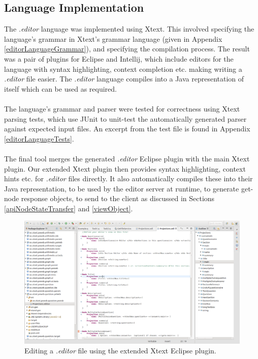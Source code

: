 \documentclass{article}
\begin{document}
{\subsection{Language Implementation}
The \emph{.editor} language was implemented using Xtext. This involved specifying the language's grammar in Xtext's grammar language (given in Appendix \ref{editorLanguageGrammar}), and specifying the compilation process. The result was a pair of plugins for Eclipse and Intellij, which include editors for the language with syntax highlighting, context completion etc. making writing a \emph{.editor} file easier. The \emph{.editor} language compiles into a Java representation of itself which can be used as required.
\\
\\
The language's grammar and parser were tested for correctness using Xtext parsing tests, which use JUnit to unit-test the automatically generated parser against expected input files. An excerpt from the test file is found in Appendix \ref{editorLanguageTests}.
\\
\\
The final tool merges the generated \emph{.editor} Eclipse plugin with the main Xtext plugin. Our extended Xtext plugin then provides syntax highlighting, context hints etc. for \emph{.editor} files directly. It also automatically compiles these into their Java representation, to be used by the editor server at runtime, to generate get-node response objects, to send to the client as discussed in Sections \ref{apiNodeStateTransfer} and \ref{viewObject}.

\begin{figure}[h!]
  \centering
  \includegraphics[width=\linewidth]{./Screenshots/EditorLanguagePluginScreenshot.png}
  \caption{Editing a \emph{.editor} file using the extended Xtext Eclipse plugin.}
  \label{fig:editorEditor}
\end{figure}

}
\end{document}
